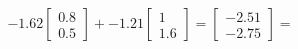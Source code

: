 \documentclass[preview]{standalone}
\begin{document}
\begin{align*}
-1.62 \begin{bmatrix} 0.8 \\ 0.5 \end{bmatrix} + -1.21 \begin{bmatrix} 1 \\ 1.6 \end{bmatrix} = \begin{bmatrix} -2.51 \\ -2.75 \end{bmatrix} =
\end{align*}
\end{document}
